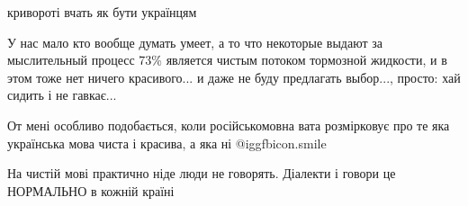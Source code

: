  
кривороті вчать як бути українцям

 

У нас мало кто вообще думать умеет, а то что некоторые выдают за мыслительный
процесс 73\% является чистым потоком тормозной жидкости, и в этом тоже нет
ничего красивого... и даже не буду предлагать выбор..., просто: хай сидить і не
гавкає...


 
От мені особливо подобається, коли російськомовна вата розмірковує про те яка
українська мова чиста і красива, а яка ні  @igg{fbicon.smile} 

 

На чистій мові практично ніде люди не говорять. Діалекти і говори це НОРМАЛЬНО
в кожній країні

